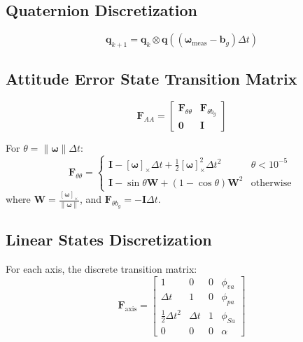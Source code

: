 \documentclass{article}
\newcommand{\vect}[1]{\bm{#1}}
\newcommand{\quat}[1]{\mathbf{#1}}
\begin{document}
\subsection{Quaternion Discretization}

\begin{equation}
\quat{q}_{k+1} = \quat{q}_k \otimes \quat{q}((\vect{\omega}_{\text{meas}} - \vect{b}_g)\Delta t)
\end{equation}

\subsection{Attitude Error State Transition Matrix}

\begin{equation}
\vect{F}_{AA} = 
\begin{bmatrix}
\vect{F}_{\theta\theta} & \vect{F}_{\theta b_g} \\
\vect{0} & \vect{I}
\end{bmatrix}
\end{equation}

For $\theta = \|\vect{\omega}\|\Delta t$:
\begin{equation}
\vect{F}_{\theta\theta} = 
\begin{cases}
\vect{I} - [\vect{\omega}]_\times \Delta t + \frac{1}{2}[\vect{\omega}]_\times^2 \Delta t^2 & \theta < 10^{-5} \\
\vect{I} - \sin\theta \vect{W} + (1-\cos\theta)\vect{W}^2 & \text{otherwise}
\end{cases}
\end{equation}
where $\vect{W} = \frac{[\vect{\omega}]_\times}{\|\vect{\omega}\|}$, and $\vect{F}_{\theta b_g} = -\vect{I}\Delta t$.

\subsection{Linear States Discretization}

For each axis, the discrete transition matrix:
\begin{equation}
\vect{F}_{\text{axis}} = 
\begin{bmatrix}
1 & 0 & 0 & \phi_{va} \\
\Delta t & 1 & 0 & \phi_{pa} \\
\frac{1}{2}\Delta t^2 & \Delta t & 1 & \phi_{Sa} \\
0 & 0 & 0 & \alpha
\end{bmatrix}
\end{equation}
\end{document}
